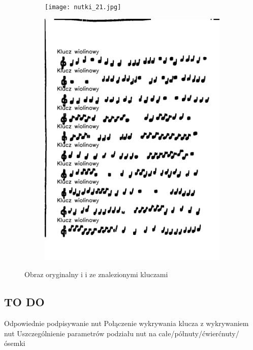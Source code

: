 \documentclass[11pt]{article}
\begin{document}
\begin{figure}[H]
    \centering
    \begin{subfigure}{.5\textwidth}
        \centering
        \graphicspath{ {Resources/} }
        \texttt{[image: nutki\_21.jpg]}
        \label{figsub1}
    \end{subfigure}%
    \begin{subfigure}{.5\textwidth}
        \centering
        \graphicspath{ {keys/} }
        \includegraphics[width=.9\linewidth]{image_21.jpg}
        \label{figsub2}
    \end{subfigure}
    \caption{Obraz oryginalny i i ze znalezionymi kluczami}
    \label{figwygKlucze02}
\end{figure}

\subsection{TO DO}
Odpowiednie podpisywanie nut \newline
Połączenie wykrywania klucza z wykrywaniem nut\newline
Uszczególnienie parametrów podziału nut na całe/półnuty/ćwierćnuty/ósemki\newline
\end{document}
